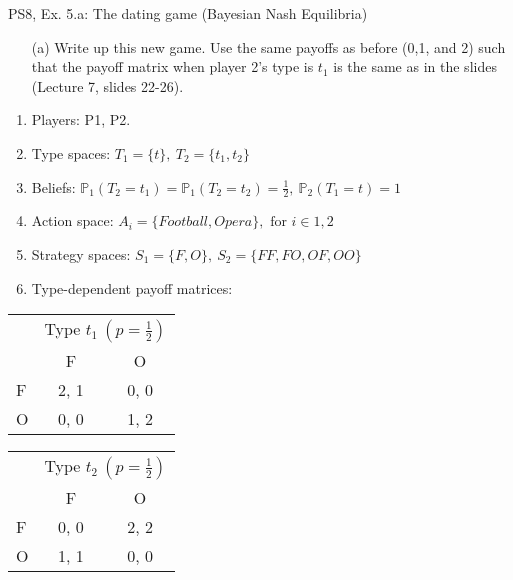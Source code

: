 \begin{frame}{PS8, Ex. 5.a: The dating game (Bayesian Nash Equilibria)}
    \begin{itemize}
      \item[(a)] Write up this new game. Use the same payoffs as before (0,1, and 2) such that the payoff matrix when player 2’s type is $t_1$ is the same as in the slides (Lecture 7, slides 22-26).
    \end{itemize}
    \vspace{-4pt}
    \begin{enumerate}
      \item Players: P1, P2.
      \item Type spaces: $T_1=\{t\},\ T_2=\{t_1,t_2\}$
      \item Beliefs: $\mathbb{P}_1(T_2=t_1)=\mathbb{P}_1(T_2=t_2)=\frac{1}{2},\ \mathbb{P}_2(T_1=t)=1$
      \item Action space: $A_i=\{Football,Opera\},\text{ for }i\in1,2$
      \item Strategy spaces: $S_1=\{F,O\},\ S_2=\{FF,FO,OF,OO\}$
      \item Type-dependent payoff matrices:
    \end{enumerate}
    \vspace{-8pt}
    \begin{table}
      \begin{tabular}{l|c|c|}
        \multicolumn{1}{c}{} & \multicolumn{2}{c}{Type $t_1\ (p=\frac{1}{2})$} \\
        \multicolumn{1}{c}{} & \multicolumn{1}{c}{F} & \multicolumn{1}{c}{O} \\\cline{2-3}
        F & 2, 1 & 0, 0 \\\cline{2-3}
        O & 0, 0 & 1, 2 \\\cline{2-3}
      \end{tabular}\quad
      \begin{tabular}{l|c|c|}
        \multicolumn{1}{c}{} & \multicolumn{2}{c}{Type $t_2\ (p=\frac{1}{2})$} \\
        \multicolumn{1}{c}{} & \multicolumn{1}{c}{F} & \multicolumn{1}{c}{O} \\\cline{2-3}
        F & 0, 0 & 2, 2 \\\cline{2-3}
        O & 1, 1 & 0, 0 \\\cline{2-3}
      \end{tabular}
    \end{table}
    \vfill\null
\end{frame}

